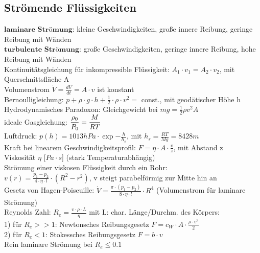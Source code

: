 \documentclass[fs, footer]{latex4ei}
\begin{document}
\begin{multicols*}{4}
\subsection{Strömende Flüssigkeiten}
$\textbf{laminare Strömung:}$ kleine Geschwindigkeiten, große innere Reibung, geringe Reibung mit Wänden\\
$\textbf{turbulente Strömung:}$ große Geschwindigkeiten, geringe innere Reibung, hohe Reibung mit Wänden\\
Kontinuitätsgleichung für inkompressible Flüssigkeit: $A_1\cdot v_1 = A_2\cdot v_2$, mit Querschnittsfläche A\\
Volumenstrom $\dot V = \frac{dV}{dt} = A\cdot v$ ist konstant\\
Bernoulligleichung: $p + \rho\cdot g\cdot h + \frac{1}{2}\cdot \rho\cdot v^2 =$ const., mit geodätischer Höhe h\\
Hydrodynamisches Paradoxon: Gleichgewicht bei $mg = \iffalse $p_{\text{atm}}\cdot A - p_1\cdot A =$ \fi
\frac{1}{2} \rho  v^2  A$\\ 

ideale Gasgleichung: $ \dfrac{\rho _0}{P_0} = \dfrac{M}{RT}$\\
Luftdruck: $p(h) = 1013hPa\cdot\exp{-\frac{h}{h_s}}$, mit $h_s = \frac{RT}{Mg} = 8428m$\\

Kraft bei linearem Geschwindigkeitsprofil: $F = \eta\cdot A\cdot\frac{v}{z}$, mit Abstand z\\
Viskosität $\eta$ [$Pa\cdot s$] (stark Temperaturabhängig)\\

Strömung einer viskosen Flüssigkeit durch ein Rohr: \\$v(r) = \frac{p_1-p_2}{4\cdot\eta\cdot l}\cdot(R^2-r^2)$, v steigt parabelförmig zur Mitte hin an\\
Gesetz von Hagen-Poiseuille: $\dot V  = \frac{\pi\cdot(p_1-p_2)}{8\cdot\eta\cdot l}\cdot R^4$ (Volumenstrom für laminare Strömung)\\

Reynolds Zahl: $R_e = \frac{v \cdot\rho \cdot L}{\eta}$ mit L: char. Länge/Durchm. des Körpers:\\ 
1) für $R_e >> 1$: Newtonsches Reibungsgesetz $F = c_W \cdot A \cdot \frac{\rho\cdot v^2}{2}$\\
2) für $R_e < 1$: Stokessches Reibungsgesetz $F = b\cdot v$\\
Rein laminare Strömung bei $R_e \leq 0.1$\\


\end{multicols*}
\end{document}
